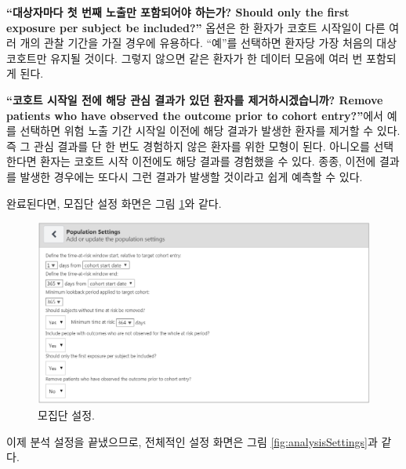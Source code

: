 \documentclass[10.5pt]{book}
\theoremstyle{definition}
\theoremstyle{definition}
\theoremstyle{definition}
\theoremstyle{remark}
\begin{document}
\textbf{``대상자마다 첫 번째 노출만 포함되어야 하는가? Should only the
first exposure per subject be included?''} 옵션은 한 환자가 코호트
시작일이 다른 여러 개의 관찰 기간을 가질 경우에 유용하다. ``예''를
선택하면 환자당 가장 처음의 대상 코호트만 유지될 것이다. 그렇지 않으면
같은 환자가 한 데이터 모음에 여러 번 포함되게 된다.

\textbf{``코호트 시작일 전에 해당 관심 결과가 있던 환자를
제거하시겠습니까? Remove patients who have observed the outcome prior to
cohort entry?''}에서 예를 선택하면 위험 노출 기간 시작일 이전에 해당
결과가 발생한 환자를 제거할 수 있다. 즉 그 관심 결과를 단 한 번도
경험하지 않은 환자를 위한 모형이 된다. 아니오를 선택한다면 환자는 코호트
시작 이전에도 해당 결과를 경험했을 수 있다. 종종, 이전에 결과를 발생한
경우에는 또다시 그런 결과가 발생할 것이라고 쉽게 예측할 수 있다.

완료된다면, 모집단 설정 화면은 그림 \ref{fig:populationSettings}와 같다.

\begin{figure}

{\centering \includegraphics[width=1\linewidth]{images/PatientLevelPrediction/populationSettings} 

}

\caption{모집단 설정.}\label{fig:populationSettings}
\end{figure}

이제 분석 설정을 끝냈으므로, 전체적인 설정 화면은 그림
\ref{fig:analysisSettings}과 같다.
\end{document}
